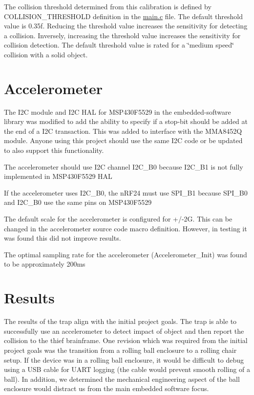 The collision threshold determined from this calibration is defined by C\+O\+L\+L\+I\+S\+I\+O\+N\+\_\+\+T\+H\+R\+E\+S\+H\+O\+LD definition in the \mbox{\hyperlink{main_8c}{main.\+c}} file. The default threshold value is 0.\+35f. Reducing the threshold value increases the sensitivity for detecting a collision. Inversely, increasing the threshold value increases the sensitivity for collision detection. The default threshold value is rated for a \char`\"{}medium speed\char`\"{} collision with a solid object.\hypertarget{index_accelerometer_notes}{}\section{Accelerometer}\label{index_accelerometer_notes}

\begin{DoxyItemize}
\item The I2C module and I2C H\+AL for M\+S\+P430\+F5529 in the embedded-\/software library was modified to add the ability to specify if a stop-\/bit should be added at the end of a I2C transaction. This was added to interface with the M\+M\+A8452Q module. Anyone using this project should use the same I2C code or be updated to also support this functionality.
\item The accelerometer should use I2C channel I2\+C\+\_\+\+B0 because I2\+C\+\_\+\+B1 is not fully implemented in M\+S\+P430\+F5529 H\+AL
\item If the accelerometer uses I2\+C\+\_\+\+B0, the n\+R\+F24 must use S\+P\+I\+\_\+\+B1 because S\+P\+I\+\_\+\+B0 and I2\+C\+\_\+\+B0 use the same pins on M\+S\+P430\+F5529
\item The default scale for the accelerometer is configured for +/-\/2G. This can be changed in the accelerometer source code macro definition. However, in testing it was found this did not improve results.
\item The optimal sampling rate for the accelerometer (Accelerometer\+\_\+\+Init) was found to be approximately 200ms
\end{DoxyItemize}\hypertarget{index_Results}{}\section{Results}\label{index_Results}
The results of the trap align with the initial project goals. The trap is able to successfully use an accelerometer to detect impact of object and then report the collision to the thief brainframe. One revision which was required from the initial project goals was the transition from a rolling ball enclosure to a rolling chair setup. If the device was in a rolling ball enclosure, it would be difficult to debug using a U\+SB cable for U\+A\+RT logging (the cable would prevent smooth rolling of a ball). In addition, we determined the mechanical engineering aspect of the ball enclosure would distract us from the main embedded software focus.

